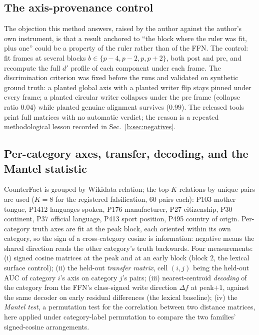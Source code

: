 \documentclass[11pt]{article}
\begin{document}
\subsection{The axis-provenance control}
\label{b:sec:provenance}

The objection this method answers, raised by the author against the
author's own instrument, is that a result anchored to ``the block where the
ruler was fit, plus one'' could be a property of the ruler rather than of
the FFN. The control: fit frames at several blocks
$b \in \{p{-}4, p{-}2, p, p{+}2\}$, both post and pre, and recompute the
full $d'$ profile of each component under each frame. The discrimination
criterion was fixed before the runs and validated on synthetic ground
truth: a planted global axis with a planted writer flip stays pinned under
every frame; a planted circular writer collapses under the pre frame
(collapse ratio $0.04$) while planted genuine alignment survives ($0.99$).
The released tools print full matrices with no automatic verdict; the
reason is a repeated methodological lesson recorded in
Sec.~\ref{b:sec:negatives}.

\subsection{Per-category axes, transfer, decoding, and the Mantel statistic}
\label{b:sec:catmethods}

CounterFact is grouped by Wikidata relation; the top-$K$ relations by
unique pairs are used ($K{=}8$ for the registered falsification, $60$ pairs
each): P103 mother tongue, P1412 languages spoken, P176 manufacturer, P27
citizenship, P30 continent, P37 official language, P413 sport position,
P495 country of origin. Per-category truth axes are fit at the peak block,
each oriented within its own category, so the sign of a cross-category
cosine is information: negative means the shared direction reads the other
category's truth backwards. Four measurements: (i) signed cosine matrices
at the peak and at an early block (block $2$, the lexical surface control);
(ii) the held-out \emph{transfer matrix}, cell $(i,j)$ being the held-out
AUC of category $i$'s axis on category $j$'s pairs; (iii) nearest-centroid
\emph{decoding} of the category from the FFN's class-signed write direction
$\Delta f$ at peak$+1$, against the same decoder on early residual
differences (the lexical baseline); (iv) the \emph{Mantel test}, a
permutation test for the correlation between two distance matrices, here
applied under category-label permutation to compare the two families'
signed-cosine arrangements.
\end{document}
